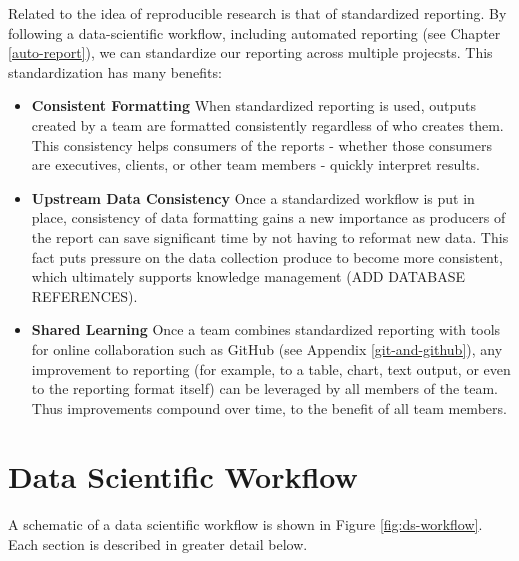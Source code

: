 \documentclass[
]{book}
\providecommand{\tightlist}{%
  \setlength{\itemsep}{0pt}\setlength{\parskip}{0pt}}
\begin{document}
Related to the idea of reproducible research is that of standardized reporting. By following a data-scientific workflow, including automated reporting (see Chapter \ref{auto-report}), we can standardize our reporting across multiple projecsts. This standardization has many benefits:

\begin{itemize}
\tightlist
\item
  \textbf{Consistent Formatting} When standardized reporting is used, outputs created by a team are formatted consistently regardless of who creates them. This consistency helps consumers of the reports - whether those consumers are executives, clients, or other team members - quickly interpret results.
\item
  \textbf{Upstream Data Consistency} Once a standardized workflow is put in place, consistency of data formatting gains a new importance as producers of the report can save significant time by not having to reformat new data. This fact puts pressure on the data collection produce to become more consistent, which ultimately supports knowledge management (ADD DATABASE REFERENCES).
\item
  \textbf{Shared Learning} Once a team combines standardized reporting with tools for online collaboration such as GitHub (see Appendix \ref{git-and-github}), any improvement to reporting (for example, to a table, chart, text output, or even to the reporting format itself) can be leveraged by all members of the team. Thus improvements compound over time, to the benefit of all team members.
\end{itemize}

\hypertarget{data-scientific-workflow}{%
\section{Data Scientific Workflow}\label{data-scientific-workflow}}

A schematic of a data scientific workflow is shown in Figure \ref{fig:ds-workflow}. Each section is described in greater detail below.
\end{document}
